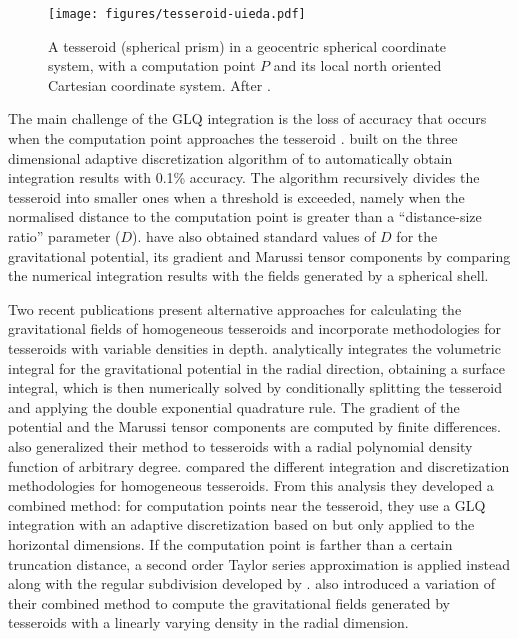 \documentclass[extra, referee]{gji}
\begin{document}
\begin{figure}
\centering
\texttt{[image: figures/tesseroid-uieda.pdf]}
\caption{
    A tesseroid (spherical prism) in a geocentric spherical coordinate system, with a
    computation point $P$ and its local north oriented Cartesian coordinate system.
    After \citet{Uieda2015}.
}
\label{fig:tesseroid}
\end{figure}

The main challenge of the GLQ integration is the loss of accuracy that occurs when the
computation point approaches the tesseroid \citep{Ku1977}.
\citet{Uieda2016} built on the three dimensional adaptive discretization algorithm of
\citet{Li2011} to automatically obtain integration results with 0.1\% accuracy.
The algorithm recursively divides the tesseroid into smaller ones when a
threshold is exceeded,
namely when the normalised distance to the computation point is greater than a
``distance-size ratio'' parameter ($D$).
\citet{Uieda2016} have also obtained standard values of $D$
for the gravitational potential, its gradient and Marussi tensor components
by comparing the numerical integration results with the fields generated by a spherical
shell.

Two recent publications present alternative approaches for calculating the gravitational
fields of homogeneous tesseroids and incorporate methodologies for tesseroids with
variable densities in depth.
\citet{Fukushima2018} analytically integrates the volumetric integral for the
gravitational potential in the radial direction, obtaining a surface integral, which is
then numerically solved by conditionally splitting the tesseroid and applying the double
exponential quadrature rule.
The gradient of the potential and the Marussi tensor components are computed by finite
differences.
\citet{Fukushima2018} also generalized their method to tesseroids with a radial
polynomial density function of arbitrary degree.
\citet{Lin2018} compared the different integration and discretization methodologies for
homogeneous tesseroids.
From this analysis they developed a combined method:
for computation points near the tesseroid, they use a GLQ integration with an adaptive
discretization based on \citet{Uieda2016} but only applied to the horizontal dimensions.
If the computation point is farther than a certain truncation distance,
a second order Taylor series approximation is applied instead along with the regular
subdivision developed by \citet{Grombein2013}.
\citet{Lin2018} also introduced a variation of their combined method to compute the
gravitational fields generated by tesseroids with a linearly varying density in the
radial dimension.
\end{document}
